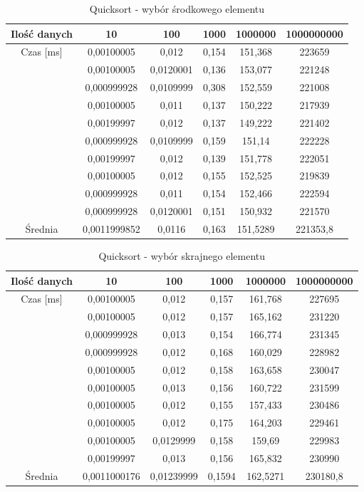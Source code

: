 \documentclass[10pt, a4paper]{article}
\begin{document}
\begin{flushleft}
\begin{table}[h]
\centering
\caption{Quicksort - wybór środkowego elementu}
\begin{tabular}{|c|c|c|c|c|c|} \hline
Ilość danych & 10 & 100 & 1000 & 1000000 & 1000000000 \\ \hline
Czas [ms] & 0,00100005 & 0,012 & 0,154 & 151,368 & 223659 \\
& 0,00100005 & 0,0120001 & 0,136 & 153,077 & 221248 \\
& 0,000999928 & 0,0109999 & 0,308 & 152,559  & 221008 \\
& 0,00100005 & 0,011 & 0,137 & 150,222 & 217939 \\
& 0,00199997 & 0,012 & 0,137 & 149,222 & 221402 \\
& 0,000999928 & 0,0109999 & 0,159 & 151,14 & 222228 \\
& 0,00199997 & 0,012 & 0,139 & 151,778 & 222051 \\
& 0,00100005 & 0,012 & 0,155 & 152,525 & 219839 \\
& 0,000999928 & 0,011 & 0,154 & 152,466 & 222594 \\
& 0,000999928 & 0,0120001 & 0,151 & 150,932 & 221570 \\ \hline
Średnia & 0,0011999852 & 0,0116 & 0,163 & 151,5289 & 221353,8 \\ \hline
\end{tabular}
\end{table}

\begin{table}[h]
\centering
\caption{Quicksort - wybór skrajnego elementu}
\begin{tabular}{|c|c|c|c|c|c|} \hline
Ilość danych & 10 & 100 & 1000 & 1000000 & 1000000000 \\ \hline
Czas [ms] & 0,00100005 & 0,012 & 0,157 & 161,768 & 227695 \\
& 0,00100005 & 0,012 & 0,157 & 165,162 & 231220 \\
& 0,000999928 & 0,013 & 0,154 & 166,774 & 231345 \\
& 0,000999928 & 0,012 & 0,168 & 160,029 & 228982 \\
& 0,00100005 & 0,012 & 0,158 & 163,658 & 230047 \\
& 0,00100005 & 0,013 & 0,156 & 160,722 & 231599 \\
& 0,00100005 & 0,012 & 0,155 & 157,433 & 230486 \\
& 0,00100005 & 0,012 & 0,175 & 164,203 & 229461 \\
& 0,00100005 & 0,0129999 & 0,158 & 159,69 & 229983 \\
& 0,00199997 & 0,013 & 0,156 & 165,832 & 230990 \\ \hline
Średnia & 0,0011000176 & 0,01239999 & 0,1594 & 162,5271 & 230180,8 \\ \hline
\end{tabular}
\end{table}


\end{flushleft}
\end{document}

